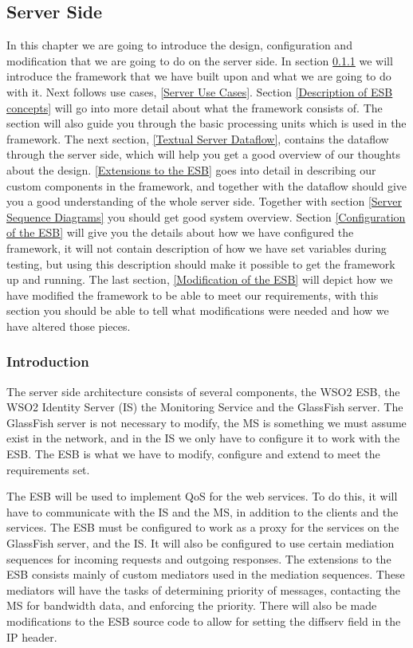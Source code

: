     \subsection{Server Side}\label{Server Side Design}

    In this chapter we are going to introduce the design, configuration and modification that we are going to do on the server side. In section \ref{Server Introduction} we will introduce the framework that we have built upon and what we are going to do with it. Next follows use cases, \ref{Server Use Cases}. Section \ref{Description of ESB concepts} will go into more detail about what the framework consists of. The section will also guide you through the basic processing units which is used in the framework. The next section, \ref{Textual Server Dataflow}, contains the dataflow through the server side, which will help you get a good overview of our thoughts about the design. \ref{Extensions to the ESB} goes into detail in describing our custom components in the framework, and together with the dataflow should give you a good understanding of the whole server side. Together with section \ref{Server Sequence Diagrams} you should get good system overview. Section \ref{Configuration of the ESB} will give you the details about how we have configured the framework, it will not contain description of how we have set variables during testing, but using this description should make it possible to get the framework up and running. The last section, \ref{Modification of the ESB} will depict how we have modified the framework to be able to meet our requirements, with this section you should be able to tell what modifications were needed and how we have altered those pieces. 

    \subsubsection{Introduction}\label{Server Introduction}
    The server side architecture consists of several components, the WSO2 ESB, the WSO2 Identity Server (IS) the Monitoring Service and the GlassFish server. The GlassFish server is not necessary to modify, the MS is something we must assume exist in the network, and in the IS we only have to configure it to work with the ESB. The ESB is what we have to modify, configure and extend to meet the requirements set.

    The ESB will be used to implement QoS for the web services. To do this, it will have to communicate with the IS and the MS, in addition to the clients and the services. The ESB must be configured to work as a proxy for the services on the GlassFish server, and the IS. It will also be configured to use certain mediation sequences for incoming requests and outgoing responses. The extensions to the ESB consists mainly of custom mediators used in the mediation sequences. These mediators will have the tasks of determining priority of messages, contacting the MS for bandwidth data, and enforcing the priority. There will also be made modifications to the ESB source code to allow for setting the diffserv field in the IP header.
    
